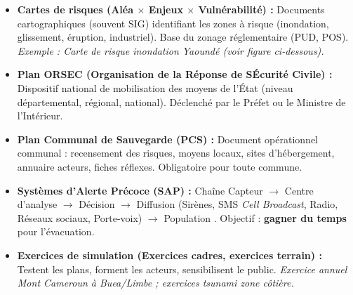 \documentclass[11pt]{article}
\begin{document}
\begin{propriete}
\begin{itemize}
    \item \textbf{Cartes de risques (Aléa $\times$ Enjeux $\times$ Vulnérabilité) :} Documents cartographiques (souvent SIG) identifiant les zones à risque (inondation, glissement, éruption, industriel). Base du zonage réglementaire (PUD, POS). \emph{Exemple : Carte de risque inondation Yaoundé (voir figure ci-dessous).}
    \item \textbf{Plan ORSEC (Organisation de la Réponse de SÉcurité Civile) :} Dispositif national de mobilisation des moyens de l'État (niveau départemental, régional, national). Déclenché par le Préfet ou le Ministre de l'Intérieur.
    \item \textbf{Plan Communal de Sauvegarde (PCS) :} Document opérationnel communal : recensement des risques, moyens locaux, sites d'hébergement, annuaire acteurs, fiches réflexes. Obligatoire pour toute commune.
    \item \textbf{Systèmes d'Alerte Précoce (SAP) :} Chaîne \og Capteur $\rightarrow$ Centre d'analyse $\rightarrow$ Décision $\rightarrow$ Diffusion (Sirènes, SMS \emph{Cell Broadcast}, Radio, Réseaux sociaux, Porte-voix) $\rightarrow$ Population \fg. Objectif : \textbf{gagner du temps} pour l'évacuation.
    \item \textbf{Exercices de simulation (Exercices cadres, exercices terrain) :} Testent les plans, forment les acteurs, sensibilisent le public. \emph{Exercice annuel \og Mont Cameroun \fg à Buea/Limbe ; exercices tsunami zone côtière.}
\end{itemize}
\end{propriete}
\end{document}
